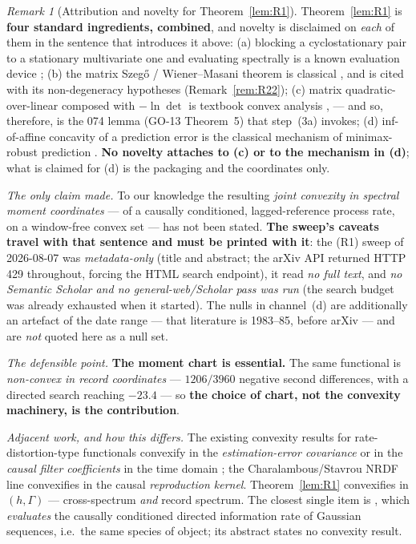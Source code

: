 \documentclass[11pt]{article}
\theoremstyle{definition}
\theoremstyle{remark}
\newtheorem{remark}{Remark}
\begin{document}
\begin{remark}[Attribution and novelty for Theorem~\ref{lem:R1}]
\label{rem:R1novelty}
Theorem~\ref{lem:R1} is \textbf{four standard ingredients, combined},
and novelty is disclaimed on \emph{each} of them in the sentence that
introduces it above: (a) blocking a cyclostationary pair to a
stationary multivariate one and evaluating spectrally is a known
evaluation device \cite{bib:kge18,bib:asd20,bib:tdp24,bib:tdp25};
(b) the matrix Szeg\H o / Wiener--Masani theorem is classical
\cite{bib:wm57,bib:wm58,bib:hl58}, and is cited with its
non-degeneracy hypotheses (Remark~\ref{rem:R22}); (c) matrix
quadratic-over-linear composed with $-\ln\det$ is textbook convex
analysis \cite[Sec.~3.1.7 and 3.2.4]{bib:bv04},\cite{bib:ando79} ---
and so, therefore, is the 074 lemma (GO-13 Theorem~5) that step~(3a)
invokes; (d) inf-of-affine concavity of a prediction error is the
classical mechanism of minimax-robust prediction
\cite{bib:vp84,bib:franke85}. \textbf{No novelty attaches to (c) or to
the mechanism in (d)}; what is claimed for (d) is the packaging and
the coordinates only.

\emph{The only claim made.} To our knowledge the resulting
\emph{joint convexity in spectral moment coordinates} --- of a
causally conditioned, lagged-reference process rate, on a window-free
convex set --- has not been stated. \textbf{The sweep's caveats travel
with that sentence and must be printed with it}: the (R1) sweep of
2026-08-07 was \emph{metadata-only} (title and abstract; the arXiv API
returned HTTP 429 throughout, forcing the HTML search endpoint), it
read \emph{no full text}, and \emph{no Semantic Scholar and no
general-web/Scholar pass was run} (the search budget was already
exhausted when it started). The nulls in channel~(d) are additionally
an artefact of the date range --- that literature is 1983--85, before
arXiv --- and are \emph{not} quoted here as a null set.

\emph{The defensible point.} \textbf{The moment chart is
essential.} The same functional is \emph{non-convex in record
coordinates} --- $1206/3960$ negative second differences, with a
directed search reaching $-23.4$ --- so \textbf{the choice of chart,
not the convexity machinery, is the contribution}.

\emph{Adjacent work, and how this differs.} The existing convexity
results for rate-distortion-type functionals convexify in the
\emph{estimation-error covariance}
\cite{bib:tkpm14,bib:tanaka15,bib:stt17} or in the \emph{causal filter
coefficients} in the time domain \cite{bib:do12}; the
Charalambous/Stavrou NRDF line convexifies in the causal
\emph{reproduction kernel}. Theorem~\ref{lem:R1} convexifies in
$(h,\Gamma)$ --- cross-spectrum \emph{and} record spectrum. The
closest single item is \cite{bib:zl26}, which \emph{evaluates} the
causally conditioned directed information rate of Gaussian sequences,
i.e.\ the same species of object; its abstract states no convexity
result.


\end{remark}
\end{document}
